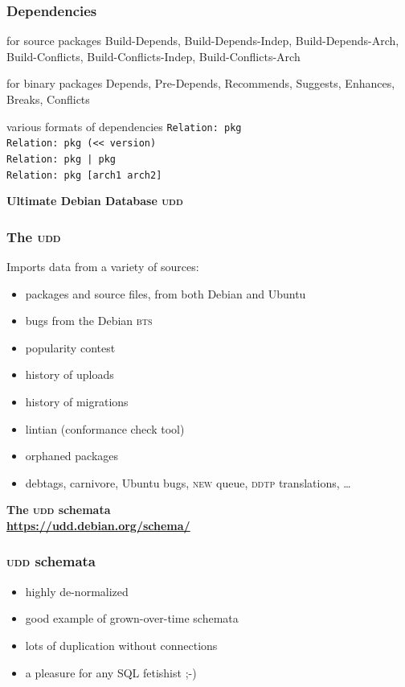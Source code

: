 \documentclass[hyperref]{beamer}
\newcommand{\acro}[1]{\textsc{\MakeLowercase{#1}}}
\newcommand{\cutin}[1]{%
\begin{frame}[c]\begin{center}{\Large\bf\color{myblue}#1}\end{center}\end{frame}}
\def\mis{\\[\medskipamount]}
\def\bis{\\[\bigskipamount]}
\begin{document}
\begin{frame}
  \frametitle{Dependencies}
  \begin{block}{for source packages}
    Build-Depends, Build-Depends-Indep, Build-Depends-Arch,
    Build-Conflicts, Build-Conflicts-Indep, Build-Conflicts-Arch 
  \end{block}

  \begin{block}{for binary packages}
    Depends, Pre-Depends, Recommends, Suggests, Enhances, Breaks, Conflicts
  \end{block}

  \begin{block}{various formats of dependencies}
    \texttt{Relation: pkg}\\
    \texttt{Relation: pkg (<< version)}\\
    \texttt{Relation: pkg | pkg}\\
    \texttt{Relation: pkg [arch1 arch2]}
  \end{block}
\end{frame}

\cutin{Ultimate Debian Database \acro{UDD}}
\begin{frame}
  \frametitle{The \acro{UDD}}
  Imports data from a variety of sources:
  \begin{itemize}
  \item packages and source files, from both Debian and Ubuntu\mis
  \item bugs from the Debian \acro{BTS}\mis
  \item popularity contest\mis
  \item history of uploads\mis
  \item history of migrations\mis
  \item lintian (conformance check tool)\mis
  \item orphaned packages\mis
  \item debtags, carnivore, Ubuntu bugs, \acro{NEW} queue, \acro{DDTP}
    translations, \ldots
  \end{itemize}
\end{frame}

\cutin{The \acro{UDD} schemata\\[12pt]
  \normalfont
  \url{https://udd.debian.org/schema/}}

\begin{frame}
  \frametitle{\acro{UDD} schemata}
  \begin{itemize}
  \item highly de-normalized\bis
  \item good example of grown-over-time schemata\bis
  \item lots of duplication without connections\bis\pause
  \item a pleasure for any SQL fetishist ;-)
  \end{itemize}
\end{frame}
\end{document}
